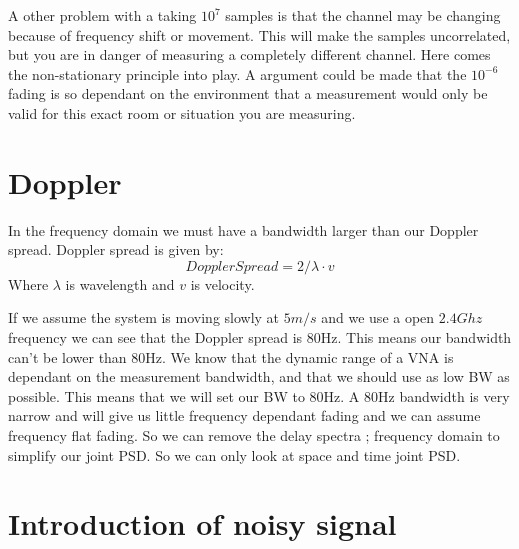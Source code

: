 A other problem with a taking $10^7$ samples is that the channel may be changing because of frequency shift or movement. This will make the samples uncorrelated, but you are in danger of measuring a completely different channel. Here comes the non-stationary principle into play. A argument could be made that the $10^{-6}$ fading is so dependant on the environment that a measurement would only be valid for this exact room or situation you are measuring.

\section{Doppler}
In the frequency domain we must have a bandwidth larger than our Doppler spread. Doppler spread is given by:
\begin{equation}
Doppler Spread = 2/\lambda \cdot v
\end{equation}
Where $\lambda$ is wavelength and $v$ is velocity.

If we assume the system is moving slowly at $5m/s$ and we use a open $2.4Ghz$ frequency we can see that the Doppler spread is 80Hz. This means our bandwidth can't be lower than 80Hz. We know that the dynamic range of a VNA is dependant on the measurement bandwidth, and that we should use as low BW as possible. This means that we will set our BW to 80Hz. A 80Hz bandwidth is very narrow and will give us little frequency dependant fading and we can assume frequency flat fading. So we can remove the delay spectra ; frequency domain to simplify our joint PSD. So we can only look at space and time joint PSD.

\section{Introduction of noisy signal}